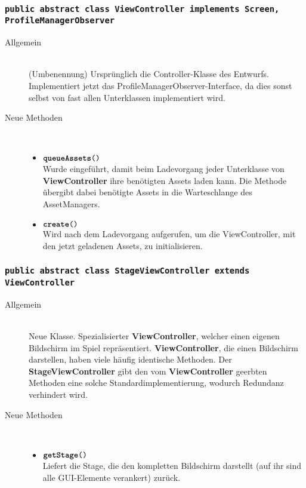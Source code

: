 \subsubsection{\normalfont \texttt{public abstract class \textbf{ViewController} implements Screen, ProfileManagerObserver}}

\begin{description}
\item[Allgemein] \hfill \\ (Umbenennung) Ursprünglich die Controller-Klasse des Entwurfs. Implementiert jetzt das ProfileManagerObserver-Interface, da dies sonst selbst von fast allen Unterklassen implementiert wird.
	
\item[Neue Methoden] \hfill \\
	\vspace{-.8cm}
	\begin{itemize}
		\item $\texttt{\textbf{queueAssets}()}$ \\ Wurde eingeführt, damit beim Ladevorgang jeder Unterklasse von \textbf{ViewController} ihre benötigten Assets laden kann. Die Methode übergibt dabei benötigte Assets in die Warteschlange des AssetManagers.
		\item $\texttt{\textbf{create}()}$ \\ Wird nach dem Ladevorgang aufgerufen, um die ViewController, mit den jetzt geladenen Assets, zu initialisieren.
	\end{itemize}
\end{description}

\subsubsection{\normalfont \texttt{public abstract class \textbf{StageViewController} extends ViewController}}

\begin{description}
\item[Allgemein] \hfill \\ Neue Klasse. Spezialisierter \textbf{ViewController}, welcher einen eigenen Bildschirm im Spiel repräsentiert. \textbf{ViewController}, die einen Bildschirm darstellen, haben viele häufig identische Methoden. Der \textbf{StageViewController} gibt den vom \textbf{ViewController} geerbten Methoden eine solche Standardimplementierung, wodurch Redundanz verhindert wird.

\item[Neue Methoden] \hfill \\
	\vspace{-.8cm}
	\begin{itemize}
		\item $\texttt{\textbf{getStage}()}$ \\ Liefert die Stage, die den kompletten Bildschirm darstellt (auf ihr sind alle GUI-Elemente verankert) zurück.
	\end{itemize}
\end{description}
